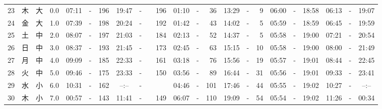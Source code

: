 \documentclass[12pt,a4j]{jsarticle}
\begin{document}
\begin{table}[htbp]
\begin{center}
{\begin{tabular}{|rc|cr|ccrccr|ccrccr|ccc|ccc|}
23 & 木 & 大 &  0.0 &  07:11 &-& 196 &  19:47 &-& 196 &  01:10 &-&  36 &  13:29 &-&   9 & 06:00 & -& 18:58 & 06:13 & -& 19:07 \\
24 & 金 & 大 &  1.0 &  07:39 &-& 198 &  20:24 &-& 192 &  01:42 &-&  43 &  14:02 &-&   5 & 05:59 & -& 18:59 & 06:45 & -& 19:59 \\
25 & 土 & 中 &  2.0 &  08:07 &-& 197 &  21:03 &-& 184 &  02:13 &-&  52 &  14:37 &-&   5 & 05:58 & -& 19:00 & 07:21 & -& 20:54 \\
26 & 日 & 中 &  3.0 &  08:37 &-& 193 &  21:45 &-& 173 &  02:45 &-&  63 &  15:15 &-&  10 & 05:58 & -& 19:00 & 08:00 & -& 21:49 \\
27 & 月 & 中 &  4.0 &  09:09 &-& 185 &  22:33 &-& 161 &  03:18 &-&  76 &  15:56 &-&  19 & 05:57 & -& 19:01 & 08:44 & -& 22:45 \\
28 & 火 & 中 &  5.0 &  09:46 &-& 175 &  23:33 &-& 150 &  03:56 &-&  89 &  16:44 &-&  31 & 05:56 & -& 19:01 & 09:33 & -& 23:41 \\
29 & 水 & 小 &  6.0 &  10:31 &-& 162 &  --:-- &-&~~~~~ &  04:46 &-& 101 &  17:46 &-&  44 & 05:55 & -& 19:02 & 10:27 & -& --:-- \\
30 & 木 & 小 &  7.0 &  00:57 &-& 143 &  11:41 &-& 149 &  06:07 &-& 110 &  19:09 &-&  54 & 05:54 & -& 19:02 & 11:26 & -& 00:34 \\
   \hline
   \end{tabular}}
   \end{center}
\end{table}
\newpage
\end{document}
